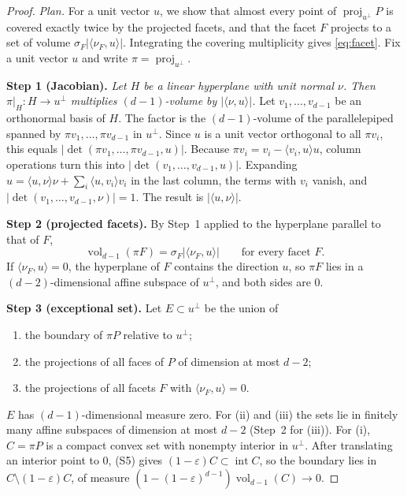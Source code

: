 \documentclass[11pt]{article}
\DeclareMathOperator{\vol}{vol}
\DeclareMathOperator{\proj}{proj}
\newcommand{\step}[1]{\smallskip\noindent\textbf{#1}}
\begin{document}
\begin{proof}
\emph{Plan.} For a unit vector \(u\), we show that almost every point of
\(\proj_{u^\perp}P\) is covered exactly twice by the projected facets, and
that the facet \(F\) projects to a set of volume
\(\sigma_F|\langle\nu_F,u\rangle|\). Integrating the covering multiplicity
gives \eqref{eq:facet}. Fix a unit vector \(u\) and write
\(\pi=\proj_{u^\perp}\).

\step{Step 1 (Jacobian).} \emph{Let \(H\) be a linear hyperplane with unit
normal \(\nu\). Then \(\pi|_H\colon H\to u^\perp\) multiplies
\((d-1)\)-volume by \(|\langle\nu,u\rangle|\).}
Let \(v_1,\dots,v_{d-1}\) be an orthonormal basis of \(H\). The factor is
the \((d-1)\)-volume of the parallelepiped spanned by
\(\pi v_1,\dots,\pi v_{d-1}\) in \(u^\perp\). Since \(u\) is a unit vector
orthogonal to all \(\pi v_i\), this equals
\(|\det(\pi v_1,\dots,\pi v_{d-1},u)|\). Because
\(\pi v_i=v_i-\langle v_i,u\rangle u\), column operations turn this into
\(|\det(v_1,\dots,v_{d-1},u)|\). Expanding
\(u=\langle u,\nu\rangle\nu+\sum_i\langle u,v_i\rangle v_i\) in the last
column, the terms with \(v_i\) vanish, and
\(|\det(v_1,\dots,v_{d-1},\nu)|=1\). The result is
\(|\langle u,\nu\rangle|\).

\step{Step 2 (projected facets).} By Step~1 applied to the hyperplane
parallel to that of \(F\),
\begin{equation}\label{eq:projfacet}
 \vol_{d-1}(\pi F)=\sigma_F|\langle\nu_F,u\rangle|
 \qquad\text{for every facet }F.
\end{equation}
If \(\langle\nu_F,u\rangle=0\), the hyperplane of \(F\) contains the
direction \(u\), so \(\pi F\) lies in a \((d-2)\)-dimensional affine
subspace of \(u^\perp\), and both sides are \(0\).

\step{Step 3 (exceptional set).} Let \(E\subset u^\perp\) be the union of
\begin{enumerate}[label=(\roman*),leftmargin=2.5em,itemsep=1pt,topsep=2pt]
\item the boundary of \(\pi P\) relative to \(u^\perp\);
\item the projections of all faces of \(P\) of dimension at most \(d-2\);
\item the projections of all facets \(F\) with
\(\langle\nu_F,u\rangle=0\).
\end{enumerate}
\(E\) has \((d-1)\)-dimensional measure zero. For (ii) and (iii) the sets
lie in finitely many affine subspaces of dimension at most \(d-2\)
(Step~2 for (iii)). For (i), \(C=\pi P\) is a compact convex set with
nonempty interior in \(u^\perp\). After translating an interior point to
\(0\), (S5) gives \((1-\varepsilon)C\subset\operatorname{int}C\), so the
boundary lies in \(C\setminus(1-\varepsilon)C\), of measure
\((1-(1-\varepsilon)^{d-1})\vol_{d-1}(C)\to0\).


\end{proof}
\end{document}
